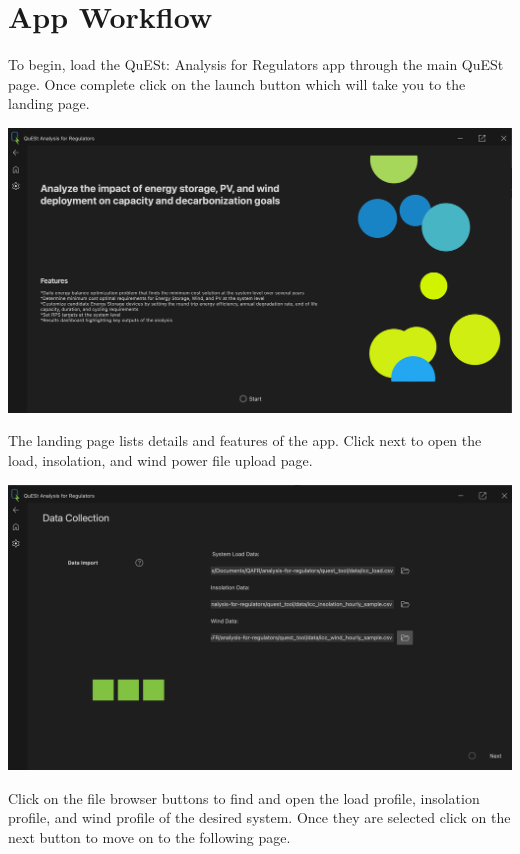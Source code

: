 \documentclass{article}
\begin{document}
\section{App Workflow}
To begin, load the QuESt: Analysis for Regulators app through the main QuESt page. Once complete click on the launch button which will take you to the landing page.

\begin{center}
    \includegraphics[width=0.8\linewidth]{pics/landing_page.png}
\end{center}
The landing page lists details and features of the app. Click next to open the load, insolation, and wind power file upload page. 

\begin{center}
    \includegraphics[width=0.8\linewidth]{pics/file_page.png}
\end{center}
Click on the file browser buttons to find and open the load profile, insolation profile, and wind profile of the desired system. Once they are selected click on the next button to move on to the following page.
\end{document}
